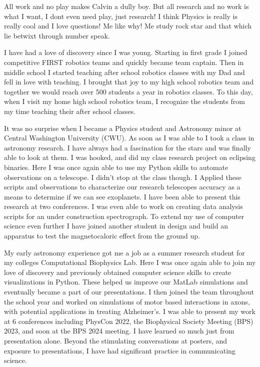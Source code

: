 \documentclass[a4paper, 12pt]{article}
\begin{document}
All work and no play makes Calvin a dully boy. But all research and no work is what I want, I dont even need play, just research! I think Physics is really is really cool and I love questions! Me like why! Me study rock star and that which lie betwixt through number speak.

I have had a love of discovery since I was young. Starting in first grade I joined competitive FIRST robotics teams and quickly became team captain. Then in middle school I started teaching after school robotics classes with my Dad and fell in love with teaching. I brought that joy to my high school robotics team and together we would reach over 500 students a year in robotics classes. To this day, when I visit my home high school robotics team, I recognize the students from my time teaching their after school classes.

It was no surprise when I became a Physics student and Astronomy minor at Central Washington University (CWU). As soon as I was able to I took a class in astronomy research. I have always had a fascination for the stars and was finally able to look at them. I was hooked, and did my class research project on eclipsing binaries. Here I was once again able to use my Python skills to automate observations on a telescope. I didn't stop at the class though. I Applied these scripts and observations to characterize our research telescopes accuracy as a means to determine if we can see exoplanets. I have been able to present this research at two conferences. I was even able to work on creating data analysis scripts for an under construction spectrograph. To extend my use of computer science even further I have joined another student in design and build an apparatus to test the magnetocaloric effect from the ground up.

My early astronomy experience got me a job as a summer research student for my colleges Computational Biophysics Lab. Here I was once again able to join my love of discovery and previously obtained computer science skills to create visualizations in Python. These helped us improve our MatLab simulations and eventually became a part of our presentations. I then joined the team throughout the school year and worked on simulations of motor based interactions in axons, with potential applications in treating Alzheimer's. I was able to present my work at 6 conferences including PhysCon 2022, the Biophysical Society Meeting (BPS) 2023, and soon at the BPS 2024 meeting. I have learned so much just from presentation alone. Beyond the stimulating conversations at posters, and exposure to presentations, I have had significant practice in communicating science.
\end{document}
